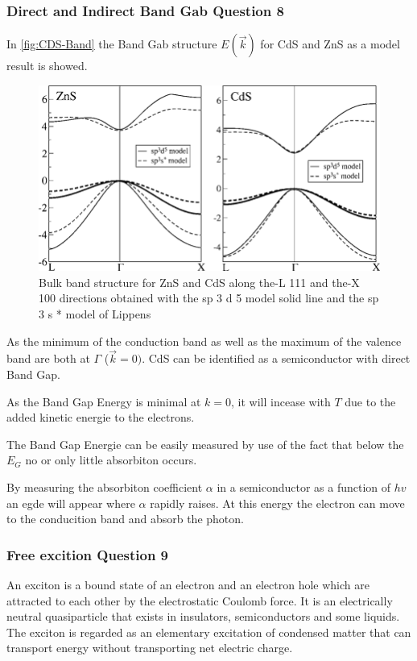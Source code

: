 \subsubsection*{Direct and Indirect Band Gab Question 8}

In \autoref{fig:CDS-Band} the Band Gab structure $E(\vec{k})$ for CdS and ZnS as 
a model result is showed.

\begin{figure}[H]
  \centering
  \includegraphics[width=0.7\linewidth]{Graphics/Chapter3/Bulk-band-structure-for-ZnS-and-CdS-along-the-L-111-and-the-X-100-directions-obtained.png}
  \caption{Bulk band structure for ZnS and CdS along the-L 111 and the-X 100 directions obtained with the sp 3 d 5 
  model solid line and the sp 3 s * model of Lippens \cite{band_gap_CdS}}
  \label{fig:CDS-Band}
\end{figure}

As the minimum of the conduction band as well as the maximum of the valence band are both 
at $\Gamma$ ($\vec{k}= 0)$. CdS can be identified as a semiconductor with
direct Band Gap.

As the Band Gap Energy is minimal at $k=0$, it will incease 
with $T$ due to the added kinetic energie to the electrons.

The Band Gap Energie can be easily measured by use of the fact
that below the $E_G$ no or only little absorbiton occurs.

By measuring the absorbiton coefficient $\alpha$ in a 
semiconductor as a function of $hv$ an egde will appear 
where $\alpha$ rapidly raises. At this energy the electron
can move to the conducition band and absorb the photon.


\subsubsection*{Free excition Question 9}

An exciton is a bound state of an electron and an electron hole which are attracted to each other by the electrostatic Coulomb force. It is an electrically neutral quasiparticle that exists in insulators, semiconductors and some liquids. The exciton is regarded as an elementary excitation of condensed matter that can transport energy without transporting net electric charge.

